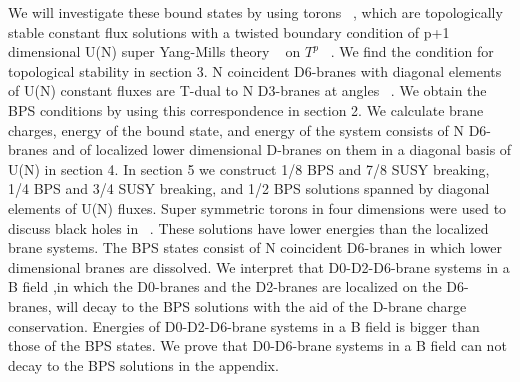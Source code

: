 \documentclass[a4paper,12pt]{article}
\begin{document}
 We will investigate these bound states by using torons ~\cite{thooft}, which are topologically stable constant flux solutions with a twisted boundary condition of p+1 dimensional U(N) super Yang-Mills theory ~\cite{SYM} on $T^p$ ~\cite{taylor, toron}. We find the condition for topological stability in section 3. N coincident D6-branes with diagonal elements of U(N) constant fluxes are T-dual to N D3-branes at angles ~\cite{angle,jabbariangle, p-p'}. We obtain the BPS conditions by using this correspondence in section 2. We calculate brane charges, energy of the bound state, and energy of the system consists of N D6-branes and of localized lower dimensional D-branes on them in a diagonal basis of U(N) in section 4. In section 5 we construct 1/8 BPS and 7/8 SUSY breaking, 1/4 BPS and 3/4 SUSY breaking, and 1/2 BPS solutions spanned by diagonal elements of U(N) fluxes. Super symmetric torons in four dimensions were used to discuss black holes in ~\cite{perry, costa}. These solutions have lower energies than the localized brane systems. The BPS states consist of N coincident D6-branes in which lower dimensional branes are dissolved. We interpret that D0-D2-D6-brane systems in a B field ,in which the D0-branes and the D2-branes are localized on the D6-branes, will decay to the BPS solutions with the aid of the D-brane charge conservation. Energies of  D0-D2-D6-brane systems in a B field is bigger than those of the BPS states. We prove that D0-D6-brane systems in a B field can not decay to the BPS solutions in the appendix. 
\end{document}
